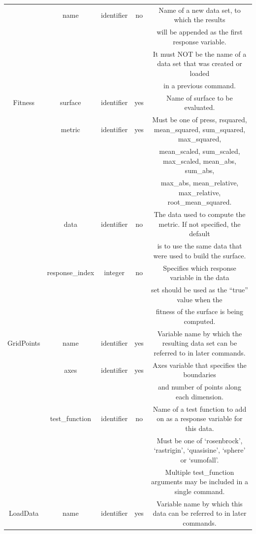 \documentclass{article}
\begin{document}
\begin{table}
\begin{tabular}{|c|c|c|c|c|}
    \hline
    & name & identifier & no & Name of a new data set, to which the results\\
    & & & & will be appended as the first response variable. \\
    & & & & It must NOT be the name of a data set that was created or
    loaded\\
    & & & & in a previous command.\\
    \hline
    Fitness & surface & identifier & yes & Name of surface to be
    evaluated.\\
    \hline
    & metric & identifier & yes & Must be one of press, rsquared,
    mean\_squared, sum\_squared, max\_squared, \\ 
    & & & & mean\_scaled, sum\_scaled, max\_scaled, mean\_abs, sum\_abs, \\
    & & & & max\_abs, mean\_relative, max\_relative, root\_mean\_squared.\\
    \hline
    & data & identifier & no & The data used to compute the metric.
    If not specified, the default\\
    & & & & is to use the same data that were used to build the
    surface.\\
    \hline
    & response\_index & integer & no & Specifies which response
    variable in the data\\ & & & & set should be used as the ``true'' value when the\\
    & & & & fitness of the surface is being computed.\\
    \hline
    GridPoints & name & identifier & yes & Variable name by which the
    resulting data set can be referred to in later commands.\\
    \hline
    & axes & identifier & yes & Axes variable that specifies the
    boundaries\\
    & & & & and number of points along each dimension.\\
    \hline
    & test\_function & identifier & no & Name of a test function to add on
    as a response variable for this data.\\
    & & & & Must be one of `rosenbrock', `rastrigin', `quasisine',
    `sphere' or `sumofall'.\\
    & & & & Multiple test\_function arguments may be included in a
    single command.\\
    \hline
    LoadData & name & identifier & yes & Variable name by which this
    data can be referred to in later commands.\\
    \hline

\end{tabular}
\end{table}
\end{document}
